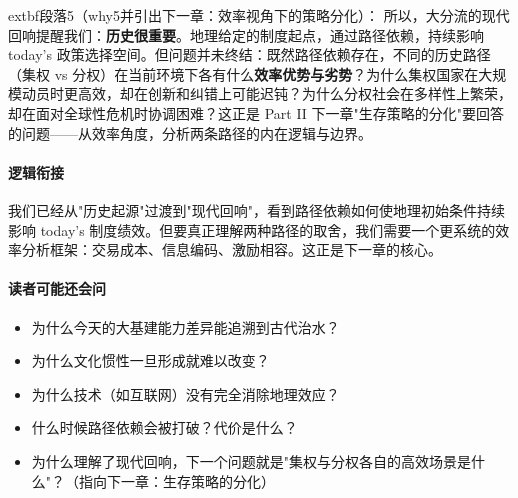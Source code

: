 \documentclass[../main.tex]{subfiles}
\begin{document}
\begin{motivation}
\begin{logicmap}
\begin{questionbox}
	extbf{段落5（why5并引出下一章：效率视角下的策略分化）}：  
所以，大分流的现代回响提醒我们：\textbf{历史很重要}。地理给定的制度起点，通过路径依赖，持续影响 today's 政策选择空间。但问题并未终结：既然路径依赖存在，不同的历史路径（集权 vs 分权）在当前环境下各有什么\textbf{效率优势与劣势}？为什么集权国家在大规模动员时更高效，却在创新和纠错上可能迟钝？为什么分权社会在多样性上繁荣，却在面对全球性危机时协调困难？这正是 Part II 下一章"生存策略的分化"要回答的问题——从效率角度，分析两条路径的内在逻辑与边界。

\paragraph*{逻辑衔接}
我们已经从"历史起源"过渡到"现代回响"，看到路径依赖如何使地理初始条件持续影响 today's 制度绩效。但要真正理解两种路径的取舍，我们需要一个更系统的效率分析框架：交易成本、信息编码、激励相容。这正是下一章的核心。

\paragraph*{读者可能还会问}
\begin{itemize}
\item 为什么今天的大基建能力差异能追溯到古代治水？
\item 为什么文化惯性一旦形成就难以改变？
\item 为什么技术（如互联网）没有完全消除地理效应？
\item 什么时候路径依赖会被打破？代价是什么？
\item 为什么理解了现代回响，下一个问题就是"集权与分权各自的高效场景是什么"？（指向下一章：生存策略的分化）
\end{itemize}

\end{questionbox}
\end{logicmap}
\end{motivation}
\end{document}
